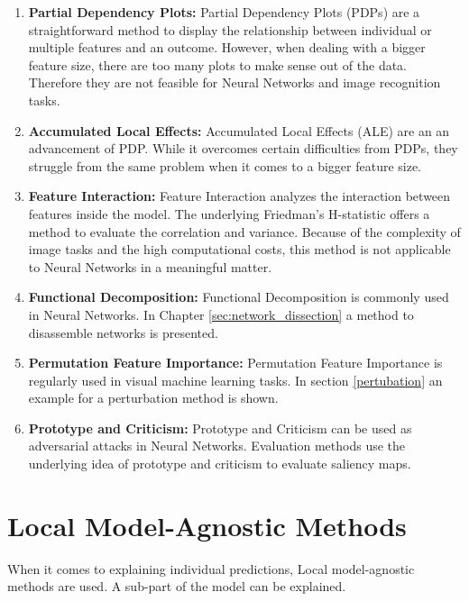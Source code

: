 \begin{enumerate}
	\item \textbf{Partial Dependency Plots:} Partial Dependency Plots (PDPs) are a straightforward method to display the relationship between individual or multiple features and an outcome. However, when dealing with a bigger feature size, there are too many plots to make sense out of the data. Therefore they are not feasible for Neural Networks and image recognition tasks.
	\item \textbf{Accumulated Local Effects:} Accumulated Local Effects (ALE) are an an advancement of PDP. While it overcomes certain difficulties from PDPs, they struggle from the same problem when it comes to a bigger feature size.
	\item \textbf{Feature Interaction:} Feature Interaction analyzes the interaction between features inside the model. The underlying Friedman's H-statistic offers a method to evaluate the correlation and variance. Because of the complexity of image tasks and the high computational costs, this method is not applicable to Neural Networks in a meaningful matter.
	\item \textbf{Functional Decomposition:} Functional Decomposition is commonly used in Neural Networks. In Chapter \ref{sec:network_dissection} a method to disassemble networks is presented.
	\item \textbf{Permutation Feature Importance:} Permutation Feature Importance is regularly used in visual machine learning tasks. In section \ref{pertubation} an example for a perturbation method is shown.
	\item \textbf{Prototype and Criticism:} Prototype and Criticism can be used as adversarial attacks in Neural Networks. \cite{xu2019adversarial} Evaluation methods use the underlying idea of prototype and criticism to evaluate saliency maps.
	
\end{enumerate}


\section{Local Model-Agnostic Methods}

When it comes to explaining individual predictions, Local model-agnostic methods are used. A sub-part of the model can be explained.


